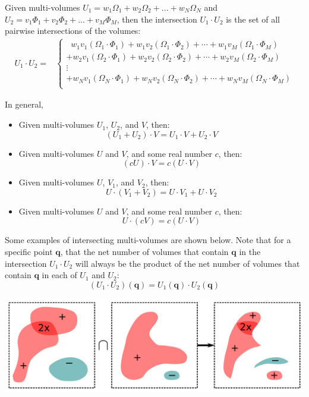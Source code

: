 \documentclass{book}
\begin{document}
Given multi-volumes \(U_1 = w_1\Omega_1 + w_2\Omega_2 + ... + w_N\Omega_N\) and \\ \(U_2 = v_1\Phi_1 + v_2\Phi_2 + ... + v_M\Phi_M\), then the intersection \(U_1 \cdot U_2\) is the set of all pairwise intersections of the volumes:
\begin{align*}
U_1 \cdot U_2 = & \left\{\begin{array}{c}
\;\; w_1 v_1 (\Omega_1 \cdot \Phi_1) + w_1 v_2 (\Omega_1 \cdot \Phi_2) + \cdots + w_1 v_M (\Omega_1 \cdot \Phi_M) \\ 
+ w_2 v_1 (\Omega_2 \cdot \Phi_1) + w_2 v_2 (\Omega_2 \cdot \Phi_2) + \cdots + w_2 v_M (\Omega_2 \cdot \Phi_M) \\ 
\vdots \\
+ w_N v_1 (\Omega_N \cdot \Phi_1) + w_N v_2 (\Omega_N \cdot \Phi_2) + \cdots + w_N v_M (\Omega_N \cdot \Phi_M) \\ 
\end{array}\right.
\end{align*}

In general,
\begin{itemize}
\item Given multi-volumes \(U_1\), \(U_2\), and \(V\), then:
\[(U_1 + U_2) \cdot V = U_1 \cdot V + U_2 \cdot V\] 
\item Given multi-volumes \(U\) and \(V\), and some real number \(c\), then:
\[(cU) \cdot V = c(U \cdot V)\]
\item Given multi-volumes \(U\), \(V_1\), and \(V_2\), then:
\[U \cdot (V_1 + V_2) = U \cdot V_1 + U \cdot V_2\] 
\item Given multi-volumes \(U\) and \(V\), and some real number \(c\), then:
\[U \cdot (cV) = c(U \cdot V)\]
\end{itemize}

Some examples of intersecting multi-volumes are shown below. Note that for a specific point \(\mathbf{q}\), that the net number of volumes that contain \(\mathbf{q}\) in the intersection \(U_1 \cdot U_2\) will always be the product of the net number of volumes that contain \(\mathbf{q}\) in each of \(U_1\) and \(U_2\):
\[(U_1 \cdot U_2)(\mathbf{q}) = U_1(\mathbf{q}) \cdot U_2(\mathbf{q})\]

\begin{center}
\includegraphics[width = \textwidth]{Intersections/Volume-volume_intersections/volume_volume_intersections_three_panel_example}
\end{center}
\end{document}
